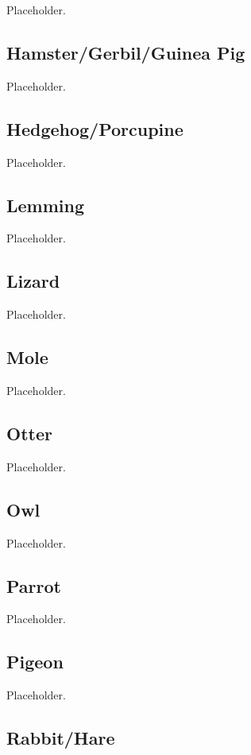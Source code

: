 Placeholder.

\subsection{Hamster/Gerbil/Guinea Pig}

Placeholder.

\subsection{Hedgehog/Porcupine}

Placeholder.

\subsection{Lemming}

Placeholder.

\subsection{Lizard}

Placeholder.

\subsection{Mole}

Placeholder.

\subsection{Otter}

Placeholder.

\subsection{Owl}

Placeholder.

\subsection{Parrot}

Placeholder.

\subsection{Pigeon}

Placeholder.

\subsection{Rabbit/Hare}

